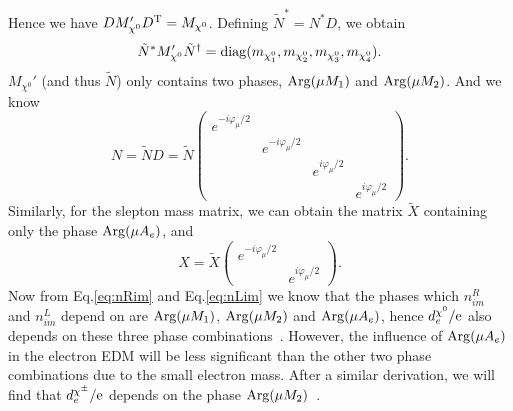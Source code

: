 \documentclass[a4paper,11pt]{article}
\begin{document}
   Hence we have $DM_{\chi^0}'D^{\rm T}=M_{\chi^0}$. Defining $\tilde N^*=N^*D$, we obtain
   \begin{equation}
       \tilde N^* M_{\chi^0}'\tilde N^\dagger={\rm diag}(m_{\chi^0_1},m_{\chi^0_2},m_{\chi^0_3},m_{\chi^0_4}).
   \end{equation}
   $M_{\chi^0}'$ (and thus $\tilde N$) only contains two phases, ${\rm Arg} (\mu M_1)$ and ${\rm Arg} (\mu M_2)$. And we know 
   \begin{equation}
       N=\tilde ND=\tilde N \begin{pmatrix}
          e^{-i\varphi_\mu/2} &   &   &  \\
            & e^{-i\varphi_\mu/2} &   &   \\
            &   & e^{i\varphi_\mu/2} &  \\
            &   &   & e^{i\varphi_\mu/2}
       \end{pmatrix}.
   \end{equation}
   Similarly, for the slepton mass matrix, we can obtain the matrix $\tilde X$ containing only the phase ${\rm Arg}(\mu A_e)$, and 
   \begin{equation}
       X=\tilde X \begin{pmatrix}
          e^{-i\varphi_\mu/2} &  \\
            & e^{i\varphi_\mu/2} 
       \end{pmatrix}.
   \end{equation}%
   Now from Eq.\eqref{eq:nRim} and Eq.\eqref{eq:nLim} we know that the phases which $n^R_{im}$ and $n^L_{im}$ depend on are ${\rm Arg} (\mu M_1)$, ${\rm Arg} (\mu M_2) $ and ${\rm Arg}(\mu A_e)$, hence $d^{\chi^0}_e/{\rm e}$ also depends on these three phase combinations~\cite{Ibrahim:2007fb,Cheung:2009fc}. However, the influence of ${\rm Arg}(\mu A_e)$ in the electron EDM will be less significant than the other two phase combinations due to the small electron mass. After a similar derivation, we will find that $d^{\chi^\pm}_e/{\rm e}$ depends on the phase ${\rm Arg} (\mu M_2)$~\cite{Ibrahim:2007fb,Cheung:2009fc}. 
   
   
\end{document}
